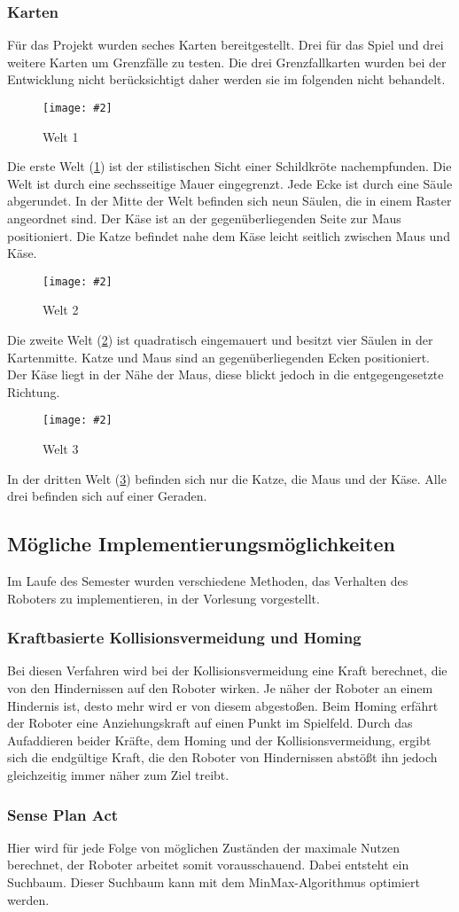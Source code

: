 \documentclass[
a4paper,     %
12pt         %
]{scrartcl}  %
\newcommand{\mygraphics}[3]{
\begin{figure}[!h]
  \begin{center}
    \texttt{[image: \#2]} \\
    \caption{#3}\label{fig:#2}
  \end{center}
\end{figure}

}
\begin{document}
\subsubsection{Karten}
Für das Projekt wurden seches Karten bereitgestellt. Drei für das Spiel und drei weitere Karten um Grenzfälle zu testen.  Die drei Grenzfallkarten wurden bei der Entwicklung nicht berücksichtigt daher werden sie im folgenden nicht behandelt.
\mygraphics{0.5\textwidth}{Welt1.png}{Welt 1}
\noindent Die erste Welt (\ref{fig:Welt1.png}) ist der stilistischen Sicht einer Schildkröte nachempfunden. Die Welt ist durch eine sechsseitige Mauer eingegrenzt. Jede Ecke ist durch eine Säule abgerundet. In der Mitte der Welt befinden sich neun Säulen, die in einem Raster angeordnet sind. Der Käse ist an der gegenüberliegenden Seite zur Maus positioniert. Die Katze befindet nahe dem Käse leicht seitlich zwischen Maus und Käse.\\ \clearpage
\mygraphics{0.5\textwidth}{Welt2.png}{Welt 2}
\noindent Die zweite Welt (\ref{fig:Welt2.png}) ist quadratisch eingemauert und besitzt vier Säulen in der Kartenmitte. Katze und Maus sind an gegenüberliegenden Ecken positioniert. Der Käse liegt in der Nähe der Maus, diese blickt jedoch in die entgegengesetzte Richtung.\\
\mygraphics{0.5\textwidth}{Welt3.png}{Welt 3}
\noindent In der dritten Welt (\ref{fig:Welt3.png}) befinden sich nur die Katze, die Maus und der Käse.
Alle drei befinden sich auf einer Geraden.\clearpage
\subsection{Mögliche Implementierungsmöglichkeiten}
Im Laufe des Semester wurden verschiedene Methoden, das Verhalten des Roboters zu implementieren, in der Vorlesung vorgestellt.
\subsubsection{Kraftbasierte Kollisionsvermeidung und Homing}
Bei diesen Verfahren wird bei der Kollisionsvermeidung eine Kraft berechnet, die von den Hindernissen auf den Roboter wirken. Je näher der Roboter an einem Hindernis ist, desto mehr wird er von diesem  abgestoßen. Beim Homing erfährt der Roboter eine Anziehungskraft auf einen Punkt im Spielfeld. Durch das Aufaddieren beider Kräfte, dem Homing und der Kollisionsvermeidung, ergibt sich die endgültige Kraft, die den Roboter von Hindernissen abstößt ihn jedoch gleichzeitig immer näher zum Ziel treibt.
\subsubsection{Sense Plan Act}
Hier wird für jede Folge von möglichen Zuständen der maximale Nutzen berechnet, der Roboter arbeitet somit vorausschauend. Dabei entsteht ein Suchbaum. Dieser Suchbaum kann mit dem MinMax-Algorithmus optimiert werden.
\end{document}
